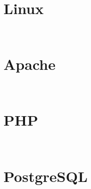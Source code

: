 \section{Linux}


\begin{lstlisting}[language=bash]

\end{lstlisting}




\begin{lstlisting}[language=bash]

\end{lstlisting}


\section{Apache}


\begin{lstlisting}[language=bash]

\end{lstlisting}





\begin{lstlisting}[language=bash]

\end{lstlisting}

\section{PHP}


\begin{lstlisting}[language=bash]

\end{lstlisting}




\begin{lstlisting}[language=bash]

\end{lstlisting}


\section{PostgreSQL}


\begin{lstlisting}[language=bash]

\end{lstlisting}




\begin{lstlisting}[language=bash]

\end{lstlisting}





